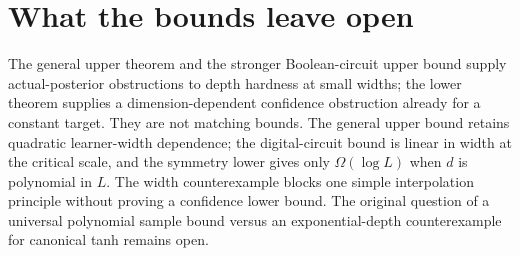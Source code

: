 \documentclass[11pt]{article}
\theoremstyle{remark}\newtheorem{remark}[theorem]{Remark}
\begin{document}
\section{What the bounds leave open}

The general upper theorem and the stronger Boolean-circuit upper bound
supply actual-posterior obstructions to depth hardness at small widths; the lower theorem supplies a dimension-dependent
confidence obstruction already for a constant target. They are not
matching bounds. The general upper bound retains quadratic learner-width dependence;
the digital-circuit bound is linear in width at the critical scale, and the symmetry lower gives only $\Omega(\log L)$ when
$d$ is polynomial in $L$. The width counterexample blocks one simple
interpolation principle without proving a confidence lower bound.
The original question of a universal polynomial sample bound versus an
exponential-depth counterexample for canonical tanh remains open.
\end{document}
